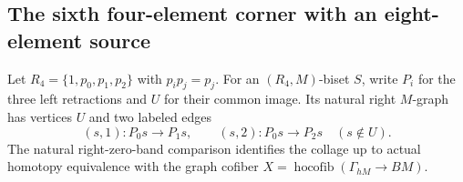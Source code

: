 \subsection{The sixth four-element corner with an eight-element source}

Let $R_4=\{1,p_0,p_1,p_2\}$ with $p_ip_j=p_j$.
For an $(R_4,M)$-biset $S$, write $P_i$ for the three
left retractions and $U$ for their common image.  Its natural
right $M$-graph has vertices $U$ and two labeled edges
\[
 (s,1):P_0s\longrightarrow P_1s,
 \qquad (s,2):P_0s\longrightarrow P_2s
 \quad(s\notin U).
\]
The natural right-zero-band comparison identifies the collage
up to actual homotopy equivalence with the graph cofiber
$X=\operatorname{hocofib}(\Gamma_{hM}\to BM)$.

